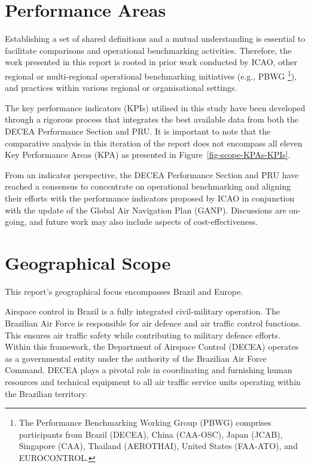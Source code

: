 \documentclass[
  a4paper,
  DIV=11,
  numbers=noendperiod]{scrreport}
\begin{document}
\section{Performance Areas}\label{performance-areas}

Establishing a set of shared definitions and a mutual understanding is
essential to facilitate comparisons and operational benchmarking
activities. Therefore, the work presented in this report is rooted in
prior work conducted by ICAO, other regional or multi-regional
operational benchmarking initiatives (e.g., PBWG \footnote{The
  Performance Benchmarking Working Group (PBWG) comprises participants
  from Brazil (DECEA), China (CAA-OSC), Japan (JCAB), Singapore (CAA),
  Thailand (AEROTHAI), United States (FAA-ATO), and EUROCONTROL.}), and
practices within various regional or organisational settings.

The key performance indicators (KPIs) utilised in this study have been
developed through a rigorous process that integrates the best available
data from both the DECEA Performance Section and PRU. It is important to
note that the comparative analysis in this iteration of the report does
not encompass all eleven Key Performance Areas (KPA) as presented in
Figure~\ref{fig-scope-KPAs-KPIs}.

From an indicator perspective, the DECEA Performance Section and PRU
have reached a consensus to concentrate on operational benchmarking and
aligning their efforts with the performance indicators proposed by ICAO
in conjunction with the update of the Global Air Navigation Plan (GANP).
Discussions are on-going, and future work may also include aspects of
cost-effectiveness.

\section{Geographical Scope}\label{geographical-scope}

This report's geographical focus encompasses Brazil and Europe.

Airspace control in Brazil is a fully integrated civil-military
operation. The Brazilian Air Force is responsible for air defence and
air traffic control functions. This ensures air traffic safety while
contributing to military defence efforts. Within this framework, the
Department of Airspace Control (DECEA) operates as a governmental entity
under the authority of the Brazilian Air Force Command. DECEA plays a
pivotal role in coordinating and furnishing human resources and
technical equipment to all air traffic service units operating within
the Brazilian territory.
\end{document}
